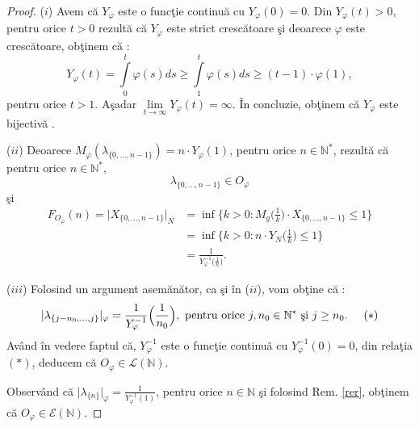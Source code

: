 \documentclass[ a4paper, 12pt]{report}
\theoremstyle{definition}
\theoremstyle{remark}
\numberwithin{equation}{section}
\begin{document}
\begin{proof} ($i$)  Avem c\u a $Y_\varphi$ este o func\c tie continu\u a cu $Y_\varphi(0) = 0$. Din $Y_\varphi(t) > 0$, pentru orice $t >0$ rezult\u a c\u a $Y_\varphi$ este strict cresc\u atoare \c si deoarece $\varphi$ este cresc\u atoare, ob\c tinem c\u a :
$$Y_\varphi(t)  = \int\limits_{0}^{t} \varphi(s) ds \geq \int\limits_{1}^{t} \varphi(s) ds \geq (t-1) \cdot \varphi(1),$$ pentru orice  $t > 1$. A\c sadar $\lim\limits_{t \rightarrow \infty} Y_\varphi(t) = \infty.$ \^In concluzie, ob\c tinem c\u a $Y_\varphi$ este bijectiv\u a .

\smallskip

($ii$) Deoarece $M_\varphi(\lambda_{\{0, \ldots, n-1\}}) = n \cdot Y_\varphi(1)$, pentru orice $ n \in \mathbb{N}^{\ast}$, rezult\u a c\u a pentru orice $n \in \mathbb{N}^{\ast}$,
$$\lambda_{\{0, \ldots, n-1\}} \in O_\varphi$$ \c si
\begin{align*}
F_{O_{\varphi}}(n) = \lvert X_{\{0,\ldots, n-1\}}\rvert_{N} &= \inf\Big\{k >0 : M_g\Big(\frac{1}{k}\Big) \cdot X_{\{0, \ldots, n-1\}}\leq 1 \Big\}\\
 &= \inf \Big\{ k>0 : n \cdot Y_N\Big(\frac{1}{k}\Big) \leq 1 \Big\}\\
  &= \frac{1}{Y_\varphi^{-1}\Big(\frac{1}{n}\Big)}.
\end{align*}

\smallskip

($iii$) Folosind un argument asem\u an\u ator, ca \c si \^in ($ii$), vom ob\c tine c\u a :
$$\lvert \lambda_{\{ j-n_0, \ldots , j \}} \rvert_{\varphi} =\frac{1}{Y_\varphi^{-1}}\Big(\frac{1}{n_0}\Big),\ \mbox{pentru orice}\  j,n_0 \in \mathbb{N}^{\ast}\ \mbox{\c si}\ j \geq n_0. \hspace{5mm} (\ast)$$
Av\^and \^in vedere faptul c\u a, $Y_\varphi^{-1}$ este o func\c tie continu\u a cu $Y_\varphi^{-1}(0) = 0$, din rela\c tia $(\ast)$, deducem c\u a $O_\varphi \in \mathcal{L}(\mathbb{N}).$

Observ\^and c\u a $\lvert \lambda_{\{ n \}} \rvert_{\varphi} = \frac{1}{Y_\varphi^{-1}(1)}$, pentru orice $n \in \mathbb{N}$ \c si folosind Rem. \ref{rer}, ob\c tinem c\u a $O_\varphi \in \mathcal{E}(\mathbb{N}).$
\end{proof}
\end{document}
